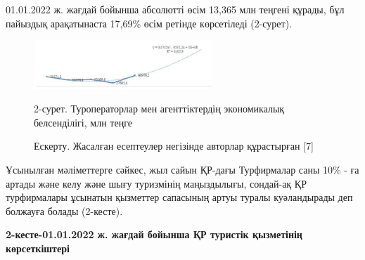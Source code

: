 01.01.2022 ж. жағдай бойынша абсолютті өсім 13,365 млн теңгені құрады,
бұл пайыздық арақатынаста 17,69\% өсім ретінде көрсетіледі (2-сурет).



\begin{figure}[H]
	\centering
	\includegraphics[width=0.6\textwidth]{media/ekon/image6.2}
	\caption*{2-сурет. Туроператорлар мен агенттіктердің экономикалық
  белсенділігі, млн теңге}
  \caption*{Ескерту. Жасалған есептеулер негізінде авторлар құрастырған {[}7{]}}
\end{figure}



Ұсынылған мәліметтерге сәйкес, жыл сайын ҚР-дағы Турфирмалар саны 10\% -
ға артады және келу және шығу туризмінің маңыздылығы, сондай-ақ ҚР
турфирмалары ұсынатын қызметтер сапасының артуы туралы куәландырады деп
болжауға болады (2-кесте).

{\bfseries 2-кесте-01.01.2022 ж. жағдай бойынша ҚР туристік қызметінің
көрсеткіштері}

